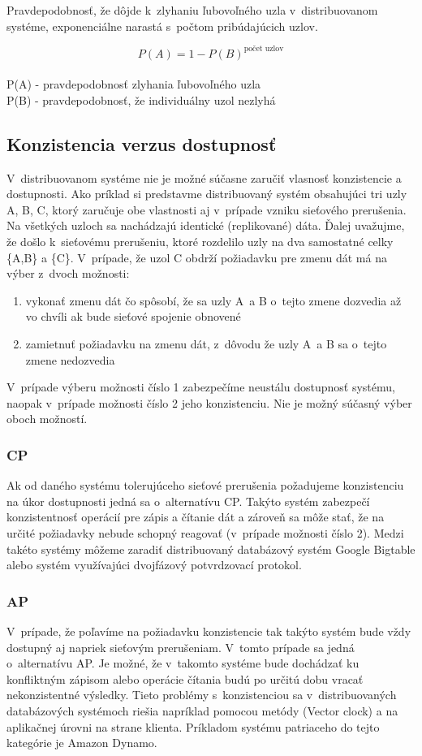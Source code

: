 \documentclass[11pt,twoside,a4paper]{book}
\begin{document}
\noindent
Pravdepodobnosť, že dôjde k~zlyhaniu ľubovoľného uzla v~distribuovanom systéme, exponenciálne narastá s~počtom pribúdajúcich uzlov.

$$P(A) = 1 - P(B)^{\textrm{počet uzlov}}$$
\\
P(A) - pravdepodobnosť zlyhania ľubovoľného uzla \\
P(B) - pravdepodobnosť, že individuálny uzol nezlyhá

\subsection{Konzistencia verzus dostupnosť}

V~distribuovanom systéme nie je možné súčasne zaručiť vlasnosť konzistencie a dostupnosti. Ako príklad si predstavme distribuovaný systém obsahujúci tri uzly A, B, C, ktorý zaručuje obe vlastnosti aj v~prípade vzniku sieťového prerušenia. Na všetkých uzloch sa nachádzajú identické (replikované) dáta. Ďalej uvažujme, že došlo k~sieťovému prerušeniu, ktoré rozdelilo uzly na dva samostatné celky \{A,B\} a \{C\}. V~prípade, že uzol C obdrží požiadavku pre zmenu dát má na výber z~dvoch možnosti:
\begin{enumerate}
 \item vykonať zmenu dát čo spôsobí, že sa uzly A~a B o~tejto zmene dozvedia až vo chvíli ak bude sieťové spojenie obnovené
 \item zamietnuť požiadavku na zmenu dát, z~dôvodu že uzly A~a B sa o~tejto zmene nedozvedia
\end{enumerate}

V~prípade výberu možnosti číslo 1 zabezpečíme neustálu dostupnosť systému, naopak v~prípade možnosti číslo 2 jeho konzistenciu. Nie je možný súčasný výber oboch možností.

\subsubsection*{CP}
Ak od daného systému tolerujúceho sieťové prerušenia požadujeme konzistenciu na úkor dostupnosti jedná sa o~alternatívu CP. Takýto systém zabezpečí konzistentnosť operácií pre zápis a čítanie dát a zároveň sa môže stať, že na určité požiadavky nebude schopný reagovať (v~prípade možnosti číslo 2). Medzi takéto systémy môžeme zaradiť distribuovaný databázový systém Google Bigtable alebo systém využívajúci dvojfázový potvrdzovací protokol.

\subsubsection*{AP}
V~prípade, že poľavíme na požiadavku konzistencie tak takýto systém bude vždy dostupný aj napriek sieťovým prerušeniam. V~tomto prípade sa jedná o~alternatívu AP. Je možné, že v~takomto systéme bude dochádzať ku konfliktným zápisom alebo operácie čítania budú po určitú dobu vracať nekonzistentné výsledky. Tieto problémy s~konzistenciou sa v~distribuovaných databázových systémoch riešia napríklad pomocou metódy  (Vector clock) \cite{decandia2007dynamo} a na aplikačnej úrovni na strane klienta. Príkladom systému patriaceho do tejto kategórie je Amazon Dynamo.
\end{document}
